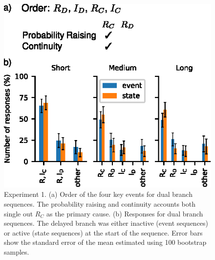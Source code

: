 \documentclass[10pt,letterpaper]{article}
\newcommand{\ev}[2]{$#1_#2$}
\begin{document}
\begin{figure}
\begin{center}
\includegraphics{figures/expt1test.eps}
\end{center}
\vspace{-0.1in}
\caption{Experiment 1. (a) Order of the four key events for dual branch sequences. The probability raising and continuity accounts both single out \ev{R}{C} as the primary cause. (b)  Responses for dual branch sequences. The delayed branch was either inactive (event sequences) or active (state sequences) at the start of the sequence. Error bars show the standard error of the mean estimated using 100 bootstrap samples.} 
\label{fig:expt1}
\end{figure}
\end{document}
